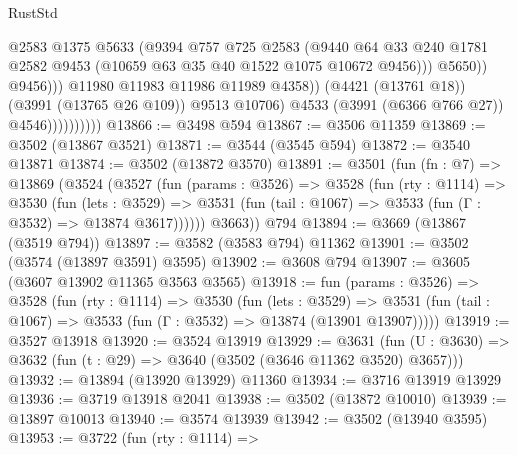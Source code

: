 \begin{lexlean}{RustStd}
\begin{coremodule}
                                        @2583
                                        @1375
                                        @5633
                                        (@9394
                                          @757
                                          @725
                                          @2583
                                          (@9440
                                            @64
                                            @33
                                            @240
                                            @1781
                                            @2582
                                            @9453
                                            (@10659 @63 @35 @40 @1522 @1075 @10672 @9456)))
                                        @5650))
                                    @9456)))
                              @11980
                              @11983
                              @11986
                              @11989
                              @4358))
                          (@4421 (@13761 @18))
                          (@3991 (@13765 @26 @109))
                          @9513
                          @10706)
                        @4533
                        (@3991 (@6366 @766 @27))
                        @4546))))))))))
@13866 := @3498 @594
@13867 := @3506 @11359
@13869 := @3502 (@13867 @3521)
@13871 := @3544 (@3545 @594)
@13872 := @3540 @13871
@13874 := @3502 (@13872 @3570)
@13891 := @3501
    (fun (fn : @7) =>
    @13869
      (@3524
        (@3527
          (fun (params : @3526) =>
          @3528
            (fun (rty : @1114) =>
            @3530
              (fun (lets : @3529) =>
              @3531 (fun (tail : @1067) => @3533 (fun (Γ : @3532) => @13874 @3617))))))
        @3663))
    @794
@13894 := @3669 (@13867 (@3519 @794))
@13897 := @3582 (@3583 @794) @11362
@13901 := @3502 (@3574 (@13897 @3591) @3595)
@13902 := @3608 @794
@13907 := @3605 (@3607 @13902 @11365 @3563 @3565)
@13918 := fun (params : @3526) =>
  @3528
    (fun (rty : @1114) =>
    @3530
      (fun (lets : @3529) =>
      @3531 (fun (tail : @1067) => @3533 (fun (Γ : @3532) => @13874 (@13901 @13907)))))
@13919 := @3527 @13918
@13920 := @3524 @13919
@13929 := @3631
    (fun (U : @3630) => @3632 (fun (t : @29) => @3640 (@3502 (@3646 @11362 @3520) @3657)))
@13932 := @13894 (@13920 @13929) @11360
@13934 := @3716 @13919 @13929
@13936 := @3719 @13918 @2041
@13938 := @3502 (@13872 @10010)
@13939 := @13897 @10013
@13940 := @3574 @13939
@13942 := @3502 (@13940 @3595)
@13953 := @3722
    (fun (rty : @1114) =>

\end{coremodule}
\end{lexlean}
